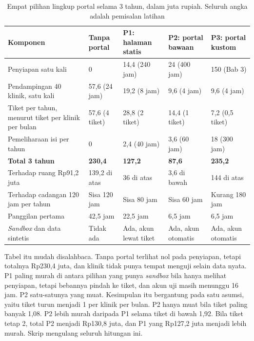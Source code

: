 \begin{table}[!htb]
  \centering
  \caption{Empat pilihan lingkup portal selama 3 tahun, dalam juta rupiah. Seluruh angka adalah pemisalan latihan}
  \label{tab:ch11-pilihan-portal}
  \footnotesize
  \begin{tabularx}{\textwidth}{GH{1.75cm}H{1.75cm}H{1.75cm}H{1.75cm}}
    \hline
    \textbf{Komponen} & \textbf{Tanpa portal} & \textbf{P1: halaman statis} & \textbf{P2: portal bawaan} & \textbf{P3: portal kustom} \\ \hline
    Penyiapan satu kali & 0 & 14,4 (240 jam) & 24 (400 jam) & 150 (Bab 3) \\ \hline
    Pendampingan 40 klinik, satu kali & 57,6 (24 jam) & 19,2 (8 jam) & 9,6 (4 jam) & 9,6 (4 jam) \\ \hline
    Tiket per tahun, menurut tiket per klinik per bulan & 57,6 (4 tiket) & 28,8 (2 tiket) & 14,4 (1 tiket) & 7,2 (0,5 tiket) \\ \hline
    Pemeliharaan isi per tahun & 0 & 2,4 (40 jam) & 3,6 (60 jam) & 18 (300 jam) \\ \hline
    \textbf{Total 3 tahun} & \textbf{230,4} & \textbf{127,2} & \textbf{87,6} & \textbf{235,2} \\ \hline
    Terhadap ruang Rp91,2 juta & 139,2 di atas & 36 di atas & 3,6 di bawah & 144 di atas \\ \hline
    Terhadap cadangan 120 jam per tahun & Sisa 120 jam & Sisa 80 jam & Sisa 60 jam & Kurang 180 jam \\ \hline
    Panggilan pertama & 42,5 jam & 22,5 jam & 6,5 jam & 6,5 jam \\ \hline
    \textit{Sandbox} dan data sintetis & Tidak ada & Ada, akun lewat tiket & Ada, akun otomatis & Ada, akun otomatis \\ \hline
  \end{tabularx}
\end{table}

Tabel itu mudah disalahbaca. Tanpa portal terlihat nol pada penyiapan, tetapi totalnya Rp230,4 juta, dan klinik tidak punya
tempat menguji selain data nyata. P1 paling murah di antara pilihan yang punya \textit{sandbox} bila hanya melihat penyiapan,
tetapi bebannya pindah ke tiket, dan akun uji masih menunggu 16 jam. P2 satu-satunya yang muat. Kesimpulan itu bergantung
pada satu asumsi, yaitu tiket turun menjadi 1 per klinik per bulan. P2 hanya muat bila tiket paling banyak 1,08. P2 lebih murah
daripada P1 selama tiket di bawah 1,92. Bila tiket tetap 2, total P2 menjadi Rp130,8 juta, dan P1 yang Rp127,2 juta menjadi
lebih murah. Skrip  mengulang seluruh hitungan ini.

